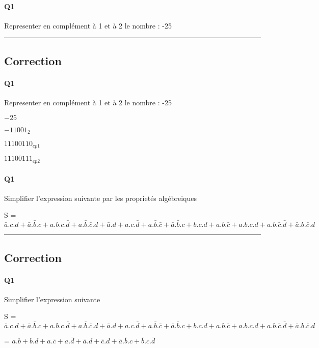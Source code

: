 \paragraph{Q1}

Representer en complément à 1 et à 2 le nombre  : -25


\hrule width 1\linewidth
\pagebreak

\subsection{Correction}


\paragraph{Q1}

Representer en complément à 1 et à 2 le nombre  : -25

$-25$

$   -11001_{2}$

$ 11100110_{cp1}$

$ 11100111_{cp2}$
\pagebreak

\paragraph{Q1}

Simplifier l'expression suivante par les proprietés algébreiques 

S = $ \bar a.c.d + \bar a.\bar b.c + a.b.c.\bar d + a.\bar b.\bar c.d  +  \bar a.d + a.c.\bar d + a.\bar b.\bar c + \bar a.\bar b.c  +  b.c.d + a.b.\bar c  +  a.b.c.d + a.b.\bar c.\bar d + \bar a.b.\bar c.d $


\hrule width 1\linewidth
\pagebreak

\subsection{Correction}


\paragraph{Q1}

Simplifier l'expression suivante

S = $ \bar a.c.d + \bar a.\bar b.c + a.b.c.\bar d + a.\bar b.\bar c.d  +  \bar a.d + a.c.\bar d + a.\bar b.\bar c + \bar a.\bar b.c  +  b.c.d + a.b.\bar c  +  a.b.c.d + a.b.\bar c.\bar d + \bar a.b.\bar c.d $

 = $ a.b + b.d + a.\bar c + a.\bar d + \bar a.d + \bar c.d + \bar a.\bar b.c + \bar b.c.\bar d $



